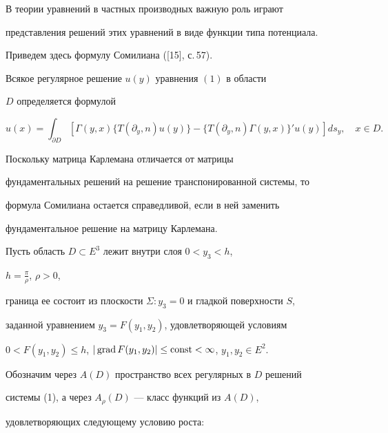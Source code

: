  


 


В теории уравнений в частных производных важную роль играют 


представления решений этих уравнений в виде функции типа потенциала. 


Приведем здесь формулу Сомилиана ([15], с.\,57). 


 


 


\begin{thm} 


Всякое регулярное решение $u(y)$ уравнения $(1)$ в области 


$D$ определяется формулой 


$$ 


u(x)=\int_{\partial D}[\Gamma(y,x)\{T(\partial_y,n)u(y)\}- 


\{T(\partial_y,n)\Gamma(y,x)\}'u(y)]ds_y,\quad x\in D. 


$$ 


\end{thm} 


 


 


Поскольку матрица Карлемана отличается от матрицы 


фундаментальных решений на решение транспонированной системы, то 


формула Сомилиана остается справедливой, если в ней заменить 


фундаментальное решение на матрицу Карлемана. 


 


Пусть область $D\subset E^3$ лежит внутри слоя $0<y_3<h$, 


$h=\frac{\pi}{\rho}$, $\rho>0$, 


граница ее состоит из плоскости $\Sigma:y_3=0$ и гладкой поверхности $S$, 


заданной уравнением $y_3=F(y_1,y_2)$, удовлетворяющей условиям 


$0<F(y_1,y_2)\le h$, $|\operatorname{grad} F(y_1,y_2)|\le\operatorname{const}<\infty$, $y_1,y_2\in E^2$. 


Обозначим через $A(D)$ пространство всех регулярных в $D$ решений 


системы (1), а через $A_\rho(D)$ --- класс функций из $A(D)$, 


удовлетворяющих следующему условию роста: 


$$ 


